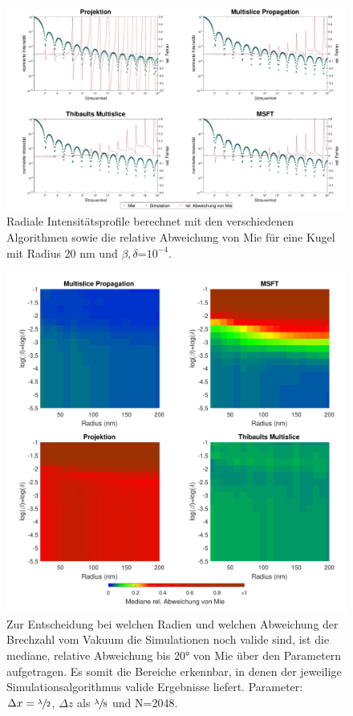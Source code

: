 \begin{figure} %
	\centering
	\includegraphics[width=1\textwidth]{images/fig_sim_profile.pdf}
	\caption[Radiale Profile]{Radiale Intensitätsprofile berechnet mit den verschiedenen Algorithmen sowie die relative Abweichung von Mie für eine Kugel mit Radius 20 \si{nm} und $\beta,\delta$=$10^{-4}$.}
	\label{fig:profil}
\end{figure}

\begin{figure} %
	\centering
	\includegraphics[width=1\textwidth]{images/fig_sim_var.pdf}
	\caption[Gültigkeit der Simulationsalgorithmen]{Zur Entscheidung bei welchen Radien und welchen Abweichung der Brechzahl vom Vakuum die Simulationen noch valide sind, ist die mediane, relative Abweichung bis 20° von Mie über den Parametern aufgetragen. Es somit die Bereiche erkennbar, in denen der jeweilige Simulationsalgorithmus valide Ergebnisse liefert. Parameter: $\Delta x=\sfrac{\lambda}{2}$, $\Delta z$ als $\sfrac{\lambda}{8}$ und N=2048.}
	\label{fig:variation}
\end{figure}




